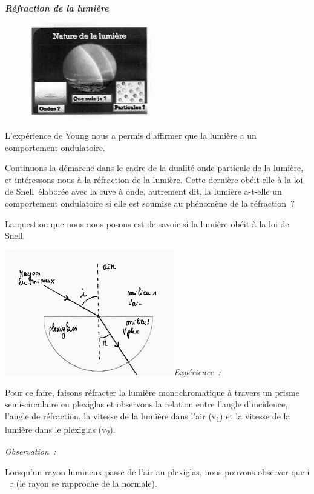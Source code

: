 \emph{\textbf{Réfraction de la lumière}}

\begin{figure}
\centering
\includegraphics[width=5.366cm,height=4.175cm]{Pictures/10000001000000F8000000C2693C9AC6103FFED7.png}
\caption{}
\end{figure}

L'expérience de Young nous a permis d'affirmer que la lumière a un
comportement ondulatoire.

Continuons la démarche dans le cadre de la dualité onde-particule de la
lumière, et intéressons-nous à la réfraction de la lumière. Cette
dernière obéit-elle à la loi de Snell~élaborée avec la cuve à onde,
autrement dit, la lumière a-t-elle un comportement ondulatoire si elle
est soumise au phénomène de la réfraction~?

La question que nous nous posons est de savoir si la lumière obéit à la
loi de Snell.

\includegraphics[width=7.398cm,height=5.456cm]{Pictures/100000010000018F0000012698B477377A07703C.png}\emph{Expérience~:
}

Pour ce faire, faisons réfracter la lumière monochromatique à travers un
prisme semi-circulaire en plexiglas et observons la relation entre
l'angle d'incidence, l'angle de réfraction, la vitesse de la lumière
dans l'air (v\textsubscript{1}) et la vitesse de la lumière dans le
plexiglas (v\textsubscript{2}).

\emph{Observation~: }

Lorsqu'un rayon lumineux passe de l'air au plexiglas, nous pouvons
observer que i  r (le rayon se rapproche de la normale).

